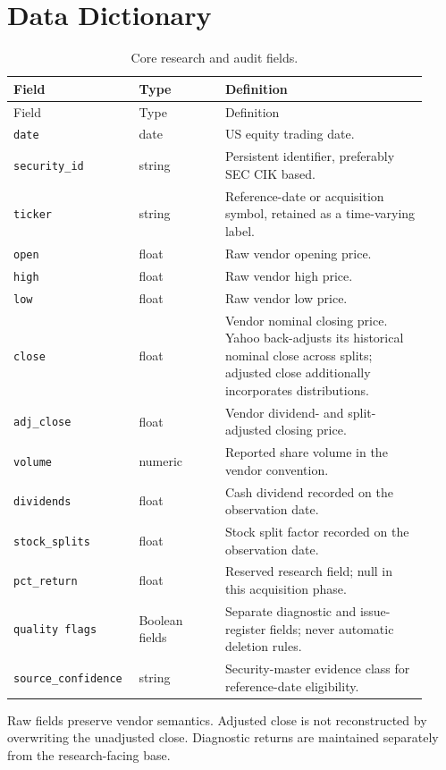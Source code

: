 \section{Data Dictionary}

\begin{longtable}{@{}p{0.25\linewidth}p{0.20\linewidth}p{0.47\linewidth}@{}}
\caption{Core research and audit fields.}\label{tab:data_dictionary}\\
\toprule
Field & Type & Definition \\
\midrule
\endfirsthead
\toprule
Field & Type & Definition \\
\midrule
\endhead
\bottomrule
\endfoot
\texttt{date} & date & US equity trading date. \\
\texttt{security\_id} & string & Persistent identifier, preferably SEC CIK based. \\
\texttt{ticker} & string & Reference-date or acquisition symbol, retained as a time-varying label. \\
\texttt{open} & float & Raw vendor opening price. \\
\texttt{high} & float & Raw vendor high price. \\
\texttt{low} & float & Raw vendor low price. \\
\texttt{close} & float & Vendor nominal closing price. Yahoo back-adjusts its historical nominal close across splits; adjusted close additionally incorporates distributions. \\
\texttt{adj\_close} & float & Vendor dividend- and split-adjusted closing price. \\
\texttt{volume} & numeric & Reported share volume in the vendor convention. \\
\texttt{dividends} & float & Cash dividend recorded on the observation date. \\
\texttt{stock\_splits} & float & Stock split factor recorded on the observation date. \\
\texttt{pct\_return} & float & Reserved research field; null in this acquisition phase. \\
\texttt{quality flags} & Boolean fields & Separate diagnostic and issue-register fields; never automatic deletion rules. \\
\texttt{source\_confidence} & string & Security-master evidence class for reference-date eligibility. \\
\end{longtable}

Raw fields preserve vendor semantics. Adjusted close is not reconstructed by
overwriting the unadjusted close. Diagnostic returns are maintained separately
from the research-facing base.
